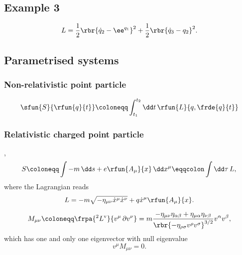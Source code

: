 \documentclass[a4paper,11pt]{article}
\begin{document}
\subsection*{Example 3}

\begin{equation}
L = \frac{1}{2} \rbr{\dot{q}_2 - \ee^{q_1}}^2 + \frac{1}{2} \rbr{\dot{q}_3 - 
q_2}^2.
\end{equation}



\subsection{Parametrised systems}

\subsubsection*{Non-relativistic point particle}

\cite[sec.\ 3.1.1]{Kiefer2012}
\begin{equation}
\sfun{S}{\rfun{q}{t}} \coloneqq \int_{t_1}^{t_2}\dd t\,\rfun{L}{q, \frde{q}{t}}
\end{equation}



\subsubsection*{Relativistic charged point particle}

\cite[sec.\ 16]{Landau1975},
\cite[sec.\ 3.1.2]{Kiefer2012}
\begin{equation}
S \coloneqq \int -m\,\dd s + e \rfun{A_\mu}{x} \,\dd x^\mu \eqqcolon \int\dd 
\tau\, L,\\
\label{eq:point-charged-action}
\end{equation}
where the Lagrangian reads
\begin{equation}
L = -m \sqrt{-\eta_{\mu\nu} \dot{x}^\mu \dot{x}^\nu } + q \dot{x}^\mu 
\rfun{A_\mu}{x}.
\end{equation}

\begin{equation}
M_{\mu\nu} \coloneqq \frpa{^2 L^\text{v}}{v^\mu\,\partial v^\nu} = 
m\frac{-\eta_{\mu\nu}\eta_{\alpha\beta} + \eta_{\mu\alpha}\eta_{\nu\beta}}%
{\rbr{-\eta_{\rho\sigma}v^\rho v^\sigma}^{3/2}} v^\alpha v^\beta,
\end{equation}
which has one and only one eigenvector with null eigenvalue
\begin{equation}
v^\mu M_{\mu\nu} = 0.
\end{equation}
\end{document}
